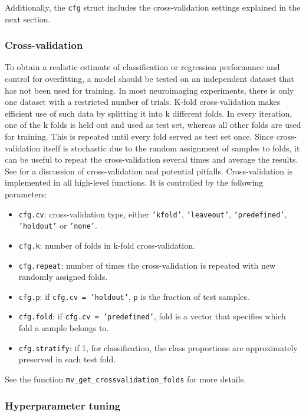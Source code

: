 \documentclass[utf8]{frontiersSCNS} %
\newcommand{\ttt}[1]{\texttt{#1}}
\begin{document}
Additionally, the \ttt{cfg} struct includes the cross-validation settings explained in the next section.


\subsubsection{Cross-validation}

To obtain a realistic estimate of classification or regression performance and control for overfitting, a model should be tested on an independent dataset that has not been used for training. In most neuroimaging experiments, there is only one dataset with a restricted number of trials. K-fold cross-validation makes efficient use of such data by splitting it into k different folds. In every iteration, one of the k folds is held out and used as test set, whereas all other folds are used for training. This is repeated until every fold served as test set once. Since cross-validation itself is stochastic due to the random assignment of samples to folds, it can be useful to repeat the cross-validation several times and average the results. See \cite{Lemm2011,Varoquaux2017} for a discussion of cross-validation and potential pitfalls. Cross-validation is implemented in all high-level functions. It is controlled by the following parameters:

\begin{itemize}
    \item \ttt{cfg.cv}: cross-validation type, either \ttt{'kfold'}, \ttt{'leaveout'}, \ttt{'predefined'}, \ttt{'holdout'} or \ttt{'none'}.
    \item \ttt{cfg.k}: number of folds in k-fold cross-validation.
    \item \ttt{cfg.repeat}: number of times the cross-validation is repeated with new randomly assigned folds.
    \item \ttt{cfg.p}: if \ttt{cfg.cv = 'holdout'}, \ttt{p} is the fraction of test samples.
    \item \ttt{cfg.fold}: if \ttt{cfg.cv = 'predefined'}, fold is a vector that  specifies which fold a sample belongs to.
    \item \ttt{cfg.stratify}: if 1, for classification, the class proportions are approximately preserved in each test fold.
\end{itemize}

See the function \ttt{mv\_get\_crossvalidation\_folds} for more details.

\subsubsection{Hyperparameter tuning}
\end{document}
